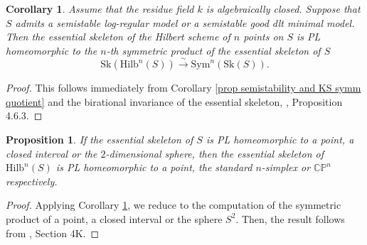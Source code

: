\documentclass{amsart}%
\numberwithin{equation}{subsection}
\theoremstyle{plain2}
\newtheorem{cor}[equation]{Corollary}
\newtheorem{prop}[equation]{Proposition}
\theoremstyle{definition2}
\theoremstyle{stepstyle}
\theoremstyle{point}
\theoremstyle{subpoint}
\newcommand{\CP}{\ensuremath{\mathbb{CP}}}
\newcommand{\Hilb}{\ensuremath{\mathrm{Hilb}}}
\newcommand{\Sk}{\mathrm{Sk}}
\begin{document}
{\begin{cor}  \label{cor essential skeleton hilb}
Assume that the residue field $k$ is algebraically closed. Suppose that $S$ admits a semistable log-regular model or a semistable good dlt minimal model. Then the essential skeleton of the Hilbert scheme of $n$ points on $S$ is PL homeomorphic to the $n$-th symmetric product of the essential skeleton of $S$ $$\Sk(\Hilb^n(S)) \xrightarrow{\sim} \text{Sym}^n(\Sk(S)).$$ 
\end{cor}
\begin{proof}
This follows immediately from Corollary \ref{prop semistability and KS symm quotient} and the birational invariance of the essential skeleton, \cite{MustataNicaise}, Proposition 4.6.3.
\end{proof}
\begin{prop} \label{prop top essential skeleton Hilb}
If the essential skeleton of $S$ is PL homeomorphic to a point, a closed interval or the $2$-dimensional sphere, then the essential skeleton of $\Hilb^n(S)$ is PL homeomorphic to a point, the standard $n$-simplex or $\CP^n$ respectively. 
\end{prop}
\begin{proof} Applying Corollary \ref{cor essential skeleton hilb}, we reduce to the computation of the symmetric product of a point, a closed interval or the sphere $S^2$. Then, the result follows from \cite{Hatcher}, Section 4K.
\end{proof}

}
\end{document}
